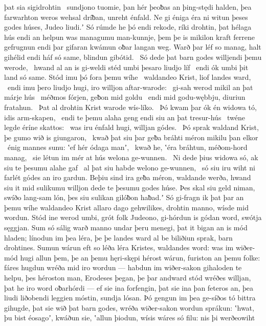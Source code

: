 þat sia sigidrohtin \hld\ sundjono tuomie,
þan hér þeoƀas an þing-stędi halden,
þea farwarhton weros wehsal dríƀan,
unreht énfald. Ne gi éniga éra ni witun
þeses godes húses, Judeo liudi.ʼ
Só rúmde he þó endi rekode, ríki drohtin,
þat hélaga hús endi an helpun was
managumu man-kunnje, þem þe is mikilon kraft
ferrene gefrugnun endi þar gifaran kwámun
oƀar langan weg. Warð þar léf so manag,
halt gihélid endi háf só same,
blindun gibótid. \hld\ Só dede þat barn godes
willjendi þemu werode, \hld\ hwand al an is gi-weldi stéd
umbi þesaro liudjo líf \hld\ endi ók umbi þit land só same.
Stód imu þó fora þemu wíhe \hld\ waldandeo Krist,
liof landes ward, \hld\ endi imu þero liudjo hugi,
iro willjon aftar-warode: \hld\ gi-sah werod mikil
an þat márje hús \hld\ méðmos fórjen,
geƀon mid goldu \hld\ endi mid godu-wębbju,
diuriun fratahun. \hld\ Þat al drohtin Krist
warode wís-líko. \hld\ Þó kwam þar ók én widowa tó,
idis arm-skapen, \hld\ endi te þemu alaha geng
endi siu an þat tresur-hús \hld\ twéne legde
éríne skattos: \hld\ was iru énfald hugi,
willjan gódes. \hld\ Þó sprak waldand Krist,
þe gumo wið is giungaron, \hld\ kwað þat siu þar geƀa bráhti
méron mikilu þan elkor \hld\ énig mannes sunu:
ʽef hér ódaga manʼ, \hld\ kwað he, ʽéra bráhtun,
méðom-hord manag, \hld\ sie létun im mér at hús
welona ge-wunnen. \hld\ Ni dede þius widowa só,
ak siu te þesumu alahe gaf \hld\ al þat siu habde
welono ge-wunnen, \hld\ só siu iru wiht ni farlét
gódes an iro gardun. Beþiu sind ira geƀa méron,
waldande werða, hwand siu it mid sulikumu willjon dede
te þesumu godes húse. Þes skal siu geld niman,
swíðo lang-sam lón, þes siu sulikan gilóƀon haƀad.ʼ
Só gi-fragn ik þat þar an þemu wíhe waldandeo Krist
allaro dago gehwilikes, drohtin manno,
wísde mid wordun. Stód ine werod umbi,
grót folk Judeono, gi-hórdun is gódan word,
swótja sęggjan. Sum só sálig warð
manno undar þeru menegi, þat it bigan an is mód hladen;
línodun im þea léra, þe þe landes ward
al be biliðiun sprak, barn drohtines.
Sumun wárun eft so léða léra Kristes,
waldandes word: was im wiðer-mód hugi
allun þem, þe an þemu hęri-skępi hérost wárun,
furiston an þemu folke: fáres hugdun
wréða mid iro wordun — habdun im wiðer-sakon
gihaloden te helpu, þes héroston man,
Erodeses þegan, þe þar andward stód
wréðes willjan, þat he iro word oƀarhórdi —
ef sie ina forfengin, þat sie ina þan feteros an,
þea liudi liðobendi leggien móstin,
sundja lósan. Þó gengun im þea ge-síðos tó
bittra gihugde, þat sie wið þat barn godes,
wréða wiðer-sakon wordun sprákun:
ʽhwat, þu bist éosagoʼ, kwáðun sie, ʽallun þiodun,
wísis wáres só filu: nis þi werðeowiht
